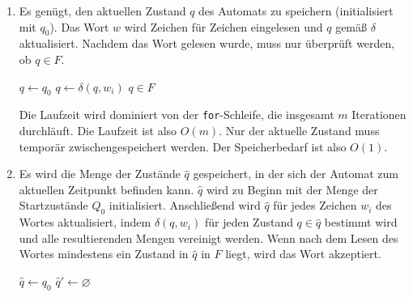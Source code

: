 \documentclass[11pt,a4paper]{article}
\begin{document}
{{\begin{loesung}
\begin{enumerate}
\begin{figure*}[h!]
        \end{figure*}
        \FloatBarrier
        bildet die gewünschte Sprache ab.
        Fertig!

        \item 
        Es genügt, den aktuellen Zustand $q$ des Automats zu speichern (initialisiert mit $q_0$).
        Das Wort $w$ wird Zeichen für Zeichen eingelesen und $q$ gemäß $\delta$ aktualisiert.
        Nachdem das Wort gelesen wurde, muss nur überprüft werden, ob $q \in F$.
        \begin{algorithmic}[1]
                \State $q \gets q_0$
                    \State $q \gets \delta(q, w_i)$
                \EndFor
                \State \Return $q \in F$
            \EndProcedure
        \end{algorithmic}
        Die Laufzeit wird dominiert von der \texttt{for}-Schleife, die insgesamt $m$ Iterationen durchläuft.
        Die Laufzeit ist also $O(m)$.
        Nur der aktuelle Zustand muss temporär zwischengespeichert werden.
        Der Speicherbedarf ist also $O(1)$.
        \item 
        Es wird die Menge der Zustände $\hat{q}$ gespeichert, in der sich der Automat zum aktuellen Zeitpunkt befinden kann.
        $\hat{q}$ wird zu Beginn mit der Menge der Startzustände $Q_0$ initialisiert.
        Anschließend wird $\hat{q}$ für jedes Zeichen $w_i$ des Wortes aktualisiert, indem $\delta(q, w_i)$ für jeden Zustand $q \in \hat{q}$ bestimmt wird und alle resultierenden Mengen vereinigt werden.
        Wenn nach dem Lesen des Wortes mindestens ein Zustand in $\hat{q}$ in $F$ liegt, wird das Wort akzeptiert.
        \begin{algorithmic}[1]
                \State $\hat{q} \gets q_0$
                    \State $\hat{q}' \gets \varnothing$

\end{algorithmic}
\end{enumerate}
\end{loesung}}}
\end{document}
